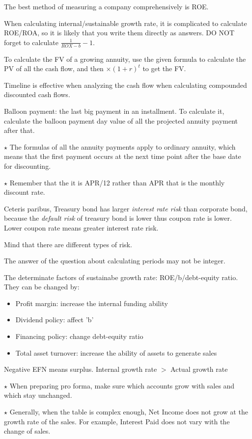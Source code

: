 \documentclass{article}
\begin{document}
The best method of measuring a company comprehensively is ROE.

When calculating internal/sustainable growth rate, it is complicated to calculate ROE/ROA, so it is likely that you write them directly as answers. DO NOT forget to calculate $\frac{1}{ROX-b}-1$.

To calculate the FV of a growing annuity, use the given formula to calculate the PV of all the cash flow, and then $\times (1+r)^t$ to get the FV.

Timeline is effective when analyzing the cash flow when calculating compounded discounted cash flows.

Balloon payment: the last big payment in an installment. To calculate it, calculate the balloon payment day value of all the projected annuity payment after that.

$\star$ The formulas of all the annuity payments apply to ordinary annuity, which means that the first payment occurs at the next time point after the base date for discounting.

$\star$ Remember that the it is APR/12 rather than APR that is the monthly discount rate.

Ceteris paribus, Treasury bond has larger \textit{interest rate risk} than corporate bond, because the \textit{default risk} of treasury bond is lower thus coupon rate is lower. Lower coupon rate means greater interest rate risk.

Mind that there are different types of risk.

The answer of the question about calculating periods may not be integer.

The determinate factors of sustainabe growth rate: ROE/b/debt-equity ratio. They can be changed by:
\begin{itemize}
	\item Profit margin: increase the internal funding ability
	\item Dividend policy: affect 'b'
	\item Financing policy: change debt-equity ratio
	\item Total asset turnover: increase the ability of assets to generate sales
\end{itemize}

Negative EFN means surplus. Internal growth rate $>$ Actual growth rate

$\star$ When preparing pro forma, make sure which accounts grow with sales and which stay unchanged. 

$\star$ Generally, when the table is complex enough, Net Income does not grow at the growth rate of the sales. For example, Interest Paid does not vary with the change of sales.
\end{document}
